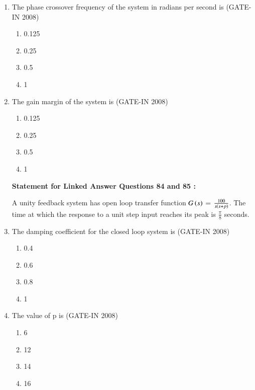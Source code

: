 \documentclass[journal,12pt,onecolumn]{IEEEtran}
\theoremstyle{remark}
\begin{document}
\begin{enumerate}
\item The phase crossover frequency of the system in radians per second is \hfill{(GATE-IN 2008)}
\begin{multicols}{4}
           \begin{enumerate} 
              \item 0.125            
              \item 0.25
              \item 0.5
              \item 1
            \end{enumerate}
            \end{multicols}

\item The gain margin of the system is \hfill{(GATE-IN 2008)}
\begin{multicols}{4}
           \begin{enumerate} 
              \item  0.125          
              \item  0.25
              \item  0.5
              \item  1
            \end{enumerate}
            \end{multicols}

\textbf{Statement for Linked Answer Questions 84 and 85 :}

A unity feedback system has open loop transfer function $G\left(s\right)$ = $\frac{100}{s\left(s+p\right)}$. The time at which the
response to a unit step input reaches its peak is $\frac{\pi}{8}$ seconds.




\item The damping coefficient for the closed loop system is \hfill{(GATE-IN 2008)}
\begin{multicols}{4}
           \begin{enumerate} 
              \item  0.4      
              \item  0.6
              \item  0.8
              \item  1
            \end{enumerate}
            \end{multicols}


\item The value of p is \hfill{(GATE-IN 2008)}
\begin{multicols}{4}
           \begin{enumerate} 
              \item 6           
              \item 12
              \item 14
              \item 16
            \end{enumerate}
\end{multicols}


\end{enumerate}
\end{document}
